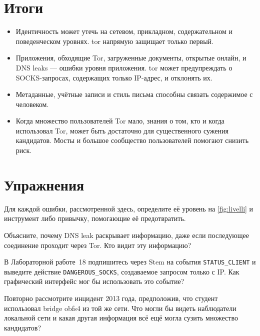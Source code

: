 \section*{Итоги}
\begin{itemize}
  \item Идентичность может утечь на сетевом, прикладном, содержательном и поведенческом уровнях. tor напрямую защищает только первый.
  \item Приложения, обходящие Tor, загруженные документы, открытые онлайн, и DNS leaks — ошибки уровня приложения. tor может предупреждать о SOCKS-запросах, содержащих только IP-адрес, и отклонять их.
  \item Метаданные, учётные записи и стиль письма способны связать содержимое с человеком.
  \item Когда множество пользователей Tor мало, знания о том, кто и когда использовал Tor, может быть достаточно для существенного сужения кандидатов. Мосты и большое сообщество пользователей помогают снизить риск.
\end{itemize}

\section*{Упражнения}

\begin{esercizio}[1]\label{es:28-livello}
Для каждой ошибки, рассмотренной здесь, определите её уровень на \cref{fig:livelli} и инструмент либо привычку, помогающие её предотвратить.
\end{esercizio}

\begin{esercizio}[1]\label{es:28-dns}
Объясните, почему DNS leak раскрывает информацию, даже если последующее соединение проходит через Tor. Кто видит эту информацию?
\end{esercizio}

\begin{esercizio}[2]\label{es:28-evento}
В Лабораторной работе~18 подпишитесь через Stem на события \texttt{STATUS\_CLIENT} и выведите действие \texttt{DANGEROUS\_SOCKS}, создаваемое запросом только с IP. Как графический интерфейс мог бы использовать это событие?
\end{esercizio}

\begin{esercizio}[2]\label{es:28-insieme}
Повторно рассмотрите инцидент 2013 года, предположив, что студент использовал bridge obfs4 из той же сети. Что могли бы видеть наблюдатели локальной сети и какая другая информация всё ещё могла сузить множество кандидатов?
\end{esercizio}

